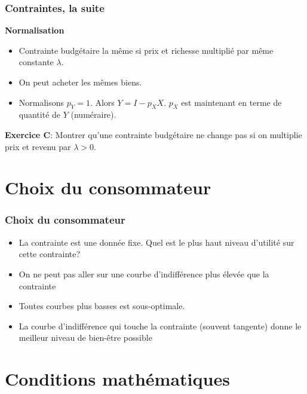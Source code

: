 \documentclass[handout]{beamer}
\begin{document}
\begin{frame}\frametitle{Contraintes, la suite}
\textbf{Normalisation}
\begin{itemize}
\item  Contrainte budgétaire la même si prix et richesse multiplié par même constante $\lambda$.
\item On peut acheter les mêmes biens.\pause
\item Normalisons $p_Y = 1$. Alors $Y = I - p_X X$. $p_X$ est maintenant en terme de quantité de $Y$ (numéraire). 
\end{itemize}
\textbf{Exercice C}: Montrer qu'une contrainte budgétaire ne change pas si on multiplie prix et revenu par $\lambda>0$. 
\end{frame}

\section{Choix du consommateur}

\begin{frame}\frametitle{Choix du consommateur}

\begin{itemize}
\item La contrainte est une donnée fixe. Quel est le plus haut niveau d'utilité sur cette contrainte?

\item On ne peut pas aller sur une courbe d'indifférence plus élevée que la contrainte

\item Toutes courbes plus basses est sous-optimale.

\item La courbe d'indifférence qui touche la contrainte (souvent tangente) donne le meilleur niveau de bien-être possible
\end{itemize}

\end{frame}

\section{Conditions mathématiques}
\end{document}
